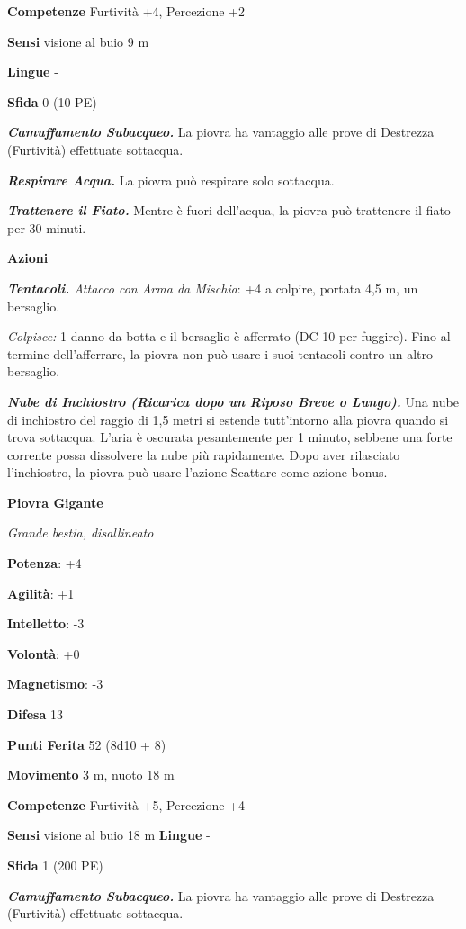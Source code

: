 \begin{multicols}{2}
\textbf{Competenze} Furtività +4, Percezione +2

\textbf{Sensi} visione al buio 9 m

\textbf{Lingue} -

\textbf{Sfida} 0 (10 PE)\smallskip

\emph{\textbf{Camuffamento Subacqueo.}} La piovra ha vantaggio alle
prove di Destrezza (Furtività) effettuate sottacqua.

\emph{\textbf{Respirare Acqua.}} La piovra può respirare solo sottacqua.

\emph{\textbf{Trattenere il Fiato.}} Mentre è fuori dell'acqua, la
piovra può trattenere il fiato per 30 minuti.

\smallskip\textbf{Azioni}

\emph{\textbf{Tentacoli.} Attacco con Arma da Mischia}: +4 a colpire,
portata 4,5 m, un bersaglio.

\emph{Colpisce:} 1 danno da botta e il bersaglio è afferrato (DC 10
per fuggire). Fino al termine dell'afferrare, la piovra non può usare i
suoi tentacoli contro un altro bersaglio.

\emph{\textbf{Nube di Inchiostro (Ricarica dopo un Riposo Breve o
Lungo).}} Una nube di inchiostro del raggio di 1,5 metri si estende
tutt'intorno alla piovra quando si trova sottacqua. L'aria è oscurata
pesantemente per 1 minuto, sebbene una forte corrente possa dissolvere
la nube più rapidamente. Dopo aver rilasciato l'inchiostro, la piovra
può usare l'azione Scattare come azione bonus.

\textbf{Piovra Gigante}

\emph{Grande bestia, disallineato}

\textbf{Potenza}: +4

\textbf{Agilità}: +1

\textbf{Intelletto}: -3

\textbf{Volontà}: +0

\textbf{Magnetismo}: -3

\textbf{Difesa} 13

\textbf{Punti Ferita} 52 (8d10 + 8)

\textbf{Movimento} 3 m, nuoto 18 m

\textbf{Competenze} Furtività +5, Percezione +4

\textbf{Sensi} visione al buio 18 m
\textbf{Lingue} -

\textbf{Sfida} 1 (200 PE)\smallskip

\emph{\textbf{Camuffamento Subacqueo.}} La piovra ha vantaggio alle
prove di Destrezza (Furtività) effettuate sottacqua.


\end{multicols}
